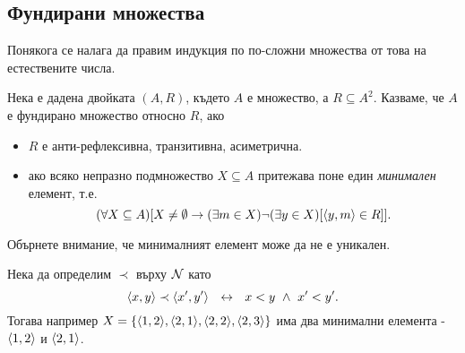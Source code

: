 \newpage
\subsection*{Фундирани множества}

Понякога се налага да правим индукция по по-сложни множества от това на естествените
числа.

\begin{dfn}
  Нека е дадена двойката $(A,R)$, където $A$ е множество, а $R\subseteq A^2$.
  Казваме, че $A$ е фундирано множество относно $R$, ако 
  \begin{itemize}
  \item 
    $R$ е анти-рефлексивна, транзитивна, асиметрична.
  \item
    ако всяко непразно подмножество $X\subseteq A$ притежава поне един {\em минимален} елемент, т.е.
    \[(\forall X\subseteq A)[X\neq\emptyset \rightarrow (\exists m\in X)\neg(\exists y\in X)[\langle{y,m}\rangle \in R]].\]
  \end{itemize}
\end{dfn}

Обърнете внимание, че минималният елемент може да не е уникален.
\begin{example}
  Нека да определим $\prec$ върху $\mathcal{N}$ като
  \[\langle{x,y}\rangle\prec\langle{x^\prime,y^\prime}\rangle\ \ \leftrightarrow\ \ x < y\ \wedge\ x^\prime < y^\prime.\]
  Тогава например $X = \{\langle{1,2}\rangle,\langle{2,1}\rangle,\langle{2,2}\rangle,\langle{2,3}\rangle\}$
  има два минимални елемента - $\langle{1,2}\rangle$ и $\langle{2,1}\rangle$.
\end{example}


